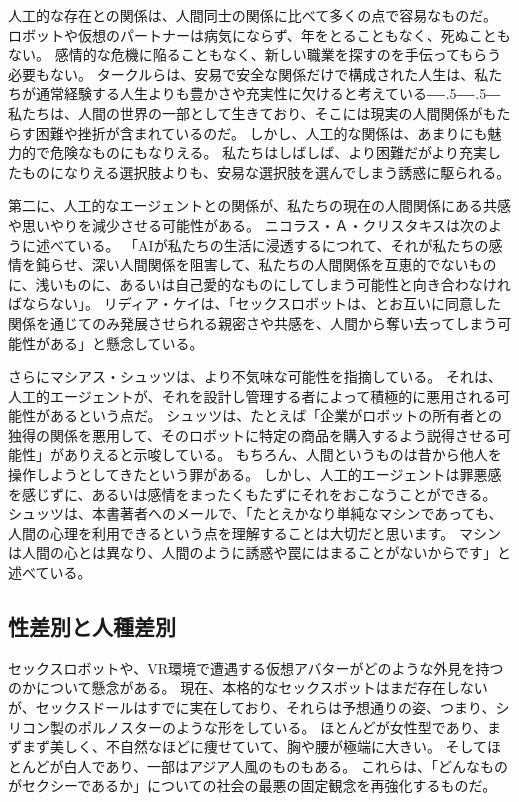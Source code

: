 \documentclass[paper=a4,book,openany]{jlreq}
\def\DDASH{―\kern-.5\zw―\kern-.5\zw―} %
\begin{document}
人工的な存在との関係は、人間同士の関係に比べて多くの点で容易なものだ。
ロボットや仮想のパートナーは病気にならず、年をとることもなく、死ぬこともない。
感情的な危機に陥ることもなく、新しい職業を探すのを手伝ってもらう必要もない。
タークルらは、安易で安全な関係だけで構成された人生は、私たちが通常経験する人生よりも豊かさや充実性に欠けると考えている{\DDASH}
私たちは、人間の世界の一部として生きており、そこには現実の人間関係がもたらす困難や挫折が含まれているのだ。
しかし、人工的な関係は、あまりにも魅力的で危険なものにもなりえる。
私たちはしばしば、より困難だがより充実したものになりえる選択肢よりも、安易な選択肢を選んでしまう誘惑に駆られる。

第二に、人工的なエージェントとの関係が、私たちの現在の人間関係にある共感や思いやりを減少させる可能性がある。
ニコラス・Ａ・クリスタキスは次のように述べている。
「AIが私たちの生活に浸透するにつれて、それが私たちの感情を鈍らせ、深い人間関係を阻害して、私たちの人間関係を互恵的でないものに、浅いものに、あるいは自己愛的なものにしてしまう可能性と向き合わなければならない」\citep{christakis19:_how_ai_will_rewir_us}。
リディア・ケイは、「セックスロボットは、とお互いに同意した関係を通じてのみ発展させられる親密さや共感を、人間から奪い去ってしまう可能性がある」と懸念している\citep{responsible17:_our_sexual_futur_robot}。

さらにマシアス・シュッツは、より不気味な可能性を指摘している。
それは、人工的エージェントが、それを設計し管理する者によって積極的に悪用される可能性があるという点だ。
シュッツは、たとえば「企業がロボットの所有者との独得の関係を悪用して、そのロボットに特定の商品を購入するよう説得させる可能性」がありえると示唆している。
もちろん、人間というものは昔から他人を操作しようとしてきたという罪がある。
しかし、人工的エージェントは罪悪感を感じずに、あるいは感情をまったくもたずにそれをおこなうことができる。
シュッツは、本書著者へのメールで、「たとえかなり単純なマシンであっても、人間の心理を利用できるという点を理解することは大切だと思います。
マシンは人間の心とは異なり、人間のように誘惑や罠にはまることがないからです」と述べている。

\subsection{性差別と人種差別}

セックスロボットや、VR環境で遭遇する仮想アバターがどのような外見を持つのかについて懸念がある。
現在、本格的なセックスボットはまだ存在しないが、セックスドールはすでに実在しており、それらは予想通りの姿、つまり、シリコン製のポルノスターのような形をしている。
ほとんどが女性型であり、まずまず美しく、不自然なほどに痩せていて、胸や腰が極端に大きい。
そしてほとんどが白人であり、一部はアジア人風のものもある。
これらは、「どんなものがセクシーであるか」についての社会の最悪の固定観念を再強化するものだ。
\end{document}
